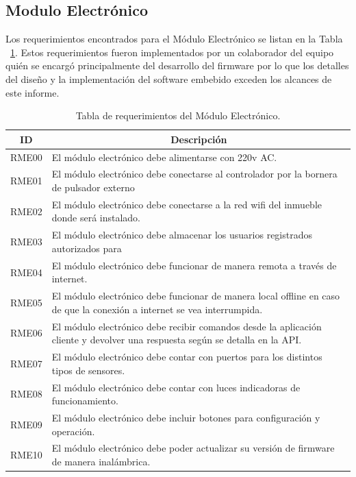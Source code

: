 \subsection{Modulo Electrónico}
Los requerimientos encontrados para el Módulo Electrónico se listan en la Tabla ~\ref{table:req_modulo_electro}.
Estos requerimientos fueron implementados por un colaborador del equipo quién se encargó principalmente del desarrollo del firmware por lo que los detalles del diseño y la implementación del software embebido exceden los alcances de este informe. 
\begin{table}[ht]
	\centering
	\begin{tabular}{|c|m{12cm}|}
		\hline
		\textbf{ID} & \multicolumn{1}{c|}{\textbf{Descripción}}                                                                                    \\ \hline
		RME00       & El módulo electrónico debe alimentarse con 220v AC.                                                                          \\ \hline
		RME01       & El módulo electrónico debe conectarse al controlador por la bornera de pulsador externo                                      \\ \hline
		RME02       & El módulo electrónico debe conectarse a la red wifi del inmueble donde será instalado.                                       \\ \hline
		RME03       & El módulo electrónico debe almacenar los usuarios registrados autorizados para                                               \\ \hline
		RME04       & El módulo electrónico debe funcionar de manera remota a través de internet.                                                  \\ \hline
		RME05       & El módulo electrónico debe funcionar de manera local offline en caso de que la conexión a internet se vea interrumpida.      \\ \hline
		RME06       & El módulo electrónico debe recibir comandos desde la aplicación cliente y devolver una respuesta según se detalla en la API. \\ \hline
		RME07       & El módulo electrónico debe contar con puertos para los distintos tipos de sensores.                                          \\ \hline
		RME08       & El módulo electrónico debe contar con luces indicadoras de funcionamiento.                                                   \\ \hline
		RME09       & El módulo electrónico debe incluir botones para configuración y operación.                                                   \\ \hline
		RME10       & El módulo electrónico debe poder actualizar su versión de firmware de manera inalámbrica.                                    \\ \hline
	\end{tabular}
	\caption[Requerimientos del Módulo Electrónico]{Tabla de requerimientos del Módulo Electrónico.}
	\label{table:req_modulo_electro}
\end{table}
